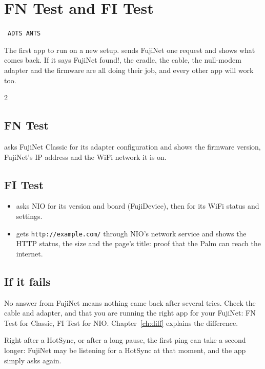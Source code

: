 \newpage
\section{FN Test and FI Test}\label{app:test}
  {\fnbadge\ \texttt{ADTS}\qquad \fibadge\ \texttt{ANTS}}

The first app to run on a new setup.  sends FujiNet one request
and shows what comes back. If it says \textsf{FujiNet found!}, the cradle,
the cable, the null-modem adapter and the firmware are all doing their job,
and every other app will work too.

\begin{center}
\hfill
{}\hfill
{}
\end{center}

\begin{multicols}{2}
\subsection*{FN Test}
 asks FujiNet Classic for its adapter configuration and
shows the firmware version, FujiNet's IP address and the WiFi network it is
on.

\subsection*{FI Test}
\begin{itemize}
  \item {} asks NIO for its version and board (FujiDevice), then
    for its WiFi status and settings.
  \item {} gets \texttt{http://example.com/} through NIO's network
    service and shows the HTTP status, the size and the page's title: proof
    that the Palm can reach the internet.
\end{itemize}

\columnbreak
\subsection*{If it fails}
\textsf{No answer from FujiNet} means nothing came back after several tries.
Check the cable and adapter, and that you are running the right app for your
FujiNet: FN Test for Classic, FI Test for NIO. Chapter~\ref{ch:diff} explains
the difference.

\begin{tip}
Right after a HotSync, or after a long pause, the first ping can take a
second longer: FujiNet may be listening for a HotSync at that moment, and the
app simply asks again.
\end{tip}
\end{multicols}

